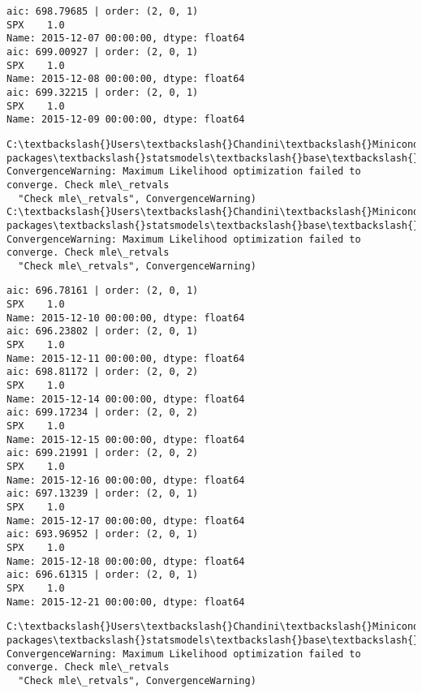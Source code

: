 \documentclass[11pt]{article}
\begin{document}
    \begin{Verbatim}[commandchars=\\\{\}]
aic: 698.79685 | order: (2, 0, 1)
SPX    1.0
Name: 2015-12-07 00:00:00, dtype: float64
aic: 699.00927 | order: (2, 0, 1)
SPX    1.0
Name: 2015-12-08 00:00:00, dtype: float64
aic: 699.32215 | order: (2, 0, 1)
SPX    1.0
Name: 2015-12-09 00:00:00, dtype: float64

    \end{Verbatim}

    \begin{Verbatim}[commandchars=\\\{\}]
C:\textbackslash{}Users\textbackslash{}Chandini\textbackslash{}Miniconda3\textbackslash{}envs\textbackslash{}auquan\textbackslash{}lib\textbackslash{}site-packages\textbackslash{}statsmodels\textbackslash{}base\textbackslash{}model.py:496: ConvergenceWarning: Maximum Likelihood optimization failed to converge. Check mle\_retvals
  "Check mle\_retvals", ConvergenceWarning)
C:\textbackslash{}Users\textbackslash{}Chandini\textbackslash{}Miniconda3\textbackslash{}envs\textbackslash{}auquan\textbackslash{}lib\textbackslash{}site-packages\textbackslash{}statsmodels\textbackslash{}base\textbackslash{}model.py:496: ConvergenceWarning: Maximum Likelihood optimization failed to converge. Check mle\_retvals
  "Check mle\_retvals", ConvergenceWarning)

    \end{Verbatim}

    \begin{Verbatim}[commandchars=\\\{\}]
aic: 696.78161 | order: (2, 0, 1)
SPX    1.0
Name: 2015-12-10 00:00:00, dtype: float64
aic: 696.23802 | order: (2, 0, 1)
SPX    1.0
Name: 2015-12-11 00:00:00, dtype: float64
aic: 698.81172 | order: (2, 0, 2)
SPX    1.0
Name: 2015-12-14 00:00:00, dtype: float64
aic: 699.17234 | order: (2, 0, 2)
SPX    1.0
Name: 2015-12-15 00:00:00, dtype: float64
aic: 699.21991 | order: (2, 0, 2)
SPX    1.0
Name: 2015-12-16 00:00:00, dtype: float64
aic: 697.13239 | order: (2, 0, 1)
SPX    1.0
Name: 2015-12-17 00:00:00, dtype: float64
aic: 693.96952 | order: (2, 0, 1)
SPX    1.0
Name: 2015-12-18 00:00:00, dtype: float64
aic: 696.61315 | order: (2, 0, 1)
SPX    1.0
Name: 2015-12-21 00:00:00, dtype: float64

    \end{Verbatim}

    \begin{Verbatim}[commandchars=\\\{\}]
C:\textbackslash{}Users\textbackslash{}Chandini\textbackslash{}Miniconda3\textbackslash{}envs\textbackslash{}auquan\textbackslash{}lib\textbackslash{}site-packages\textbackslash{}statsmodels\textbackslash{}base\textbackslash{}model.py:496: ConvergenceWarning: Maximum Likelihood optimization failed to converge. Check mle\_retvals
  "Check mle\_retvals", ConvergenceWarning)

    \end{Verbatim}
\end{document}
